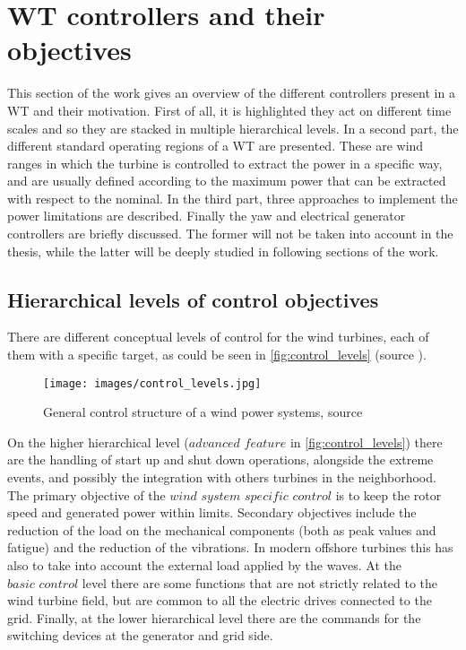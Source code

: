 \section{WT controllers and their objectives} \label{sec:control_objective}
This section of the work gives an overview of the different controllers present in a WT and their motivation. First of all, it is highlighted they act on different time scales and so they are stacked in multiple hierarchical levels. In a second part, the different standard operating regions of a WT are presented. These are wind ranges in which the turbine is controlled to extract the power in a specific way, and are usually defined according to the maximum power that can be extracted with respect to the nominal. In the third part, three approaches to implement the power limitations are described. Finally the yaw and electrical generator controllers are briefly discussed. The former will not be taken into account in the thesis, while the latter will be deeply studied in following sections of the work.  

\subsection{Hierarchical levels of control objectives}
There are different conceptual levels of control for the wind turbines, each of them with a specific target, as could be seen in \autoref{fig:control_levels} (source \cite{9535421}).
\begin{figure}[htb]
  \centering
  \texttt{[image: images/control\_levels.jpg]}
  \caption{General control structure of a wind power systems,  source \cite{9535421}}
  \label{fig:control_levels}
\end{figure}

On the higher hierarchical level ($\textit{advanced feature}$ in \autoref{fig:control_levels}) there are the handling of start up and shut down operations, alongside the extreme events, and possibly the integration with others turbines in the neighborhood. The primary objective of the $\textit{wind system specific control}$ is to keep the rotor speed and generated power within limits. Secondary objectives include the reduction of the load on the mechanical components (both as peak values and fatigue) and the reduction of the vibrations. In modern offshore turbines this has also to take into account the external load applied by the waves. At the $\textit{basic control}$ level there are some functions that are not strictly related to the wind turbine field, but are common to all the electric drives connected to the grid. Finally, at the lower hierarchical level there are the commands for the switching devices at the generator and grid side. 

